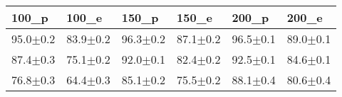 \begin{tabular}{llllll}
\toprule
100_p & 100_e & 150_p & 150_e & 200_p & 200_e \\
\midrule
95.0$\pm$0.2 & 83.9$\pm$0.2 & 96.3$\pm$0.2 & 87.1$\pm$0.2 & 96.5$\pm$0.1 & 89.0$\pm$0.1 \\
87.4$\pm$0.3 & 75.1$\pm$0.2 & 92.0$\pm$0.1 & 82.4$\pm$0.2 & 92.5$\pm$0.1 & 84.6$\pm$0.1 \\
76.8$\pm$0.3 & 64.4$\pm$0.3 & 85.1$\pm$0.2 & 75.5$\pm$0.2 & 88.1$\pm$0.4 & 80.6$\pm$0.4 \\
\bottomrule
\end{tabular}
